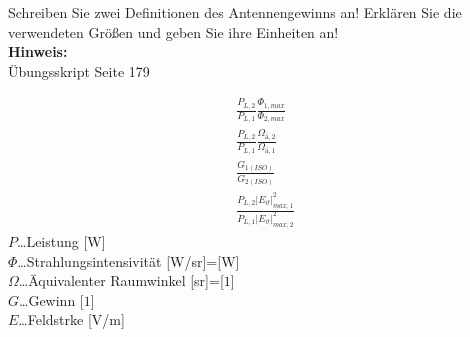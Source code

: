 \begin{question}[section=10,name={Antennengewinn 1},difficulty=,quantity=2,type=thr,tags={}]
	Schreiben Sie zwei Definitionen des Antennengewinns an! Erklären Sie
	die verwendeten Größen und geben Sie ihre Einheiten an! 
	\\ \textbf{Hinweis:}\\
	Übungsskript Seite 179
\end{question}
\begin{solution}
	\begin{align}
	&\frac{P_{L,2}}{P_{L,1}} \frac{\Phi_{1,max}}{\Phi_{2,max}}\\
	&\frac{P_{L,2}}{P_{L,1}} \frac{\Omega_{ä,2}}{\Omega_{ä,1}}\\
	&\frac{G_{1(ISO)}}{G_{2(ISO)}}\\
	&\frac{P_{L,2} |E_\vartheta|^2_{max,1}}{P_{L,1} |E_\vartheta|^2_{max,2}}
\end{align}
	$P$\dots Leistung [W]\\
	$\Phi$\dots Strahlungsintensivität [W/sr]=[W]\\
	$\Omega$\dots Äquivalenter Raumwinkel [sr]=[$1$]\\
	$G$\dots Gewinn [$1$]\\
	$E$\dots Feldstrke [V/m]
\end{solution}